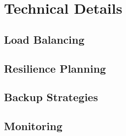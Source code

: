 \chapter{Technical Details}
\label{chap:implementation}

\section{Load Balancing}

\section{Resilience Planning}

\section{Backup Strategies}

\section{Monitoring}
